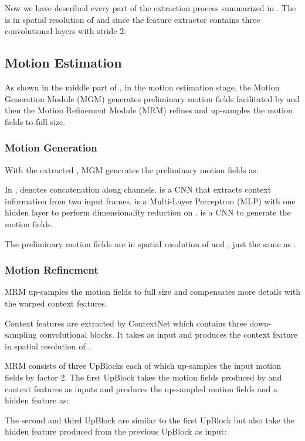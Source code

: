 \documentclass{article}
\begin{document}
Now we have described every part of the  extraction process summarized in . The  is  in spatial resolution of  and  since the feature extractor  contains three convolutional layers with stride 2.

\subsection{Motion Estimation}

As shown in the middle part of , in the motion estimation stage, the Motion Generation Module (MGM) generates preliminary motion fields facilitated by  and then the Motion Refinement Module (MRM) refines and up-samples the motion fields to full size.

\subsubsection{Motion Generation}

With the extracted , MGM generates the preliminary motion fields as:


In ,  denotes concatenation along channels.  is a CNN that extracts context information from two input frames.  is a Multi-Layer Perceptron (MLP) with one hidden layer to perform dimensionality reduction on .  is a CNN to generate the motion fields. 

The preliminary motion fields are  in spatial resolution of  and , just the same as . 

\subsubsection{Motion Refinement}

MRM up-samples the motion fields to full size and compensates more details with the warped context features.

Context features are extracted by ContextNet which contains three down-sampling convolutional blocks. It takes  as input and produces the context feature  in  spatial resolution of . 


MRM consists of three UpBlocks each of which up-samples the input motion fields by factor 2. The first UpBlock takes the motion fields produced by  and context features  as inputs and produces the up-sampled motion fields  and a hidden feature  as:


The second and third UpBlock are similar to the first UpBlock but also take the hidden feature produced from the previous UpBlock as input:
\end{document}
